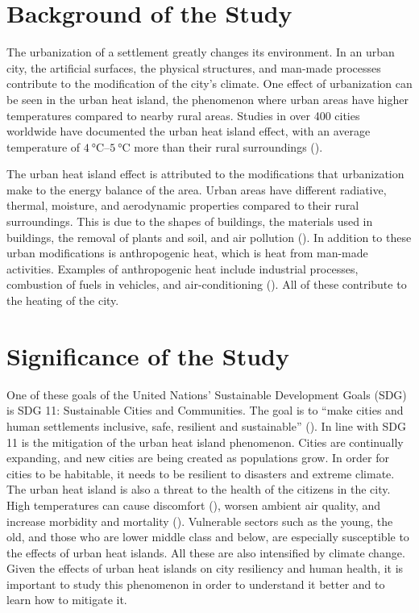 \section{Background of the Study}
	The urbanization of a settlement greatly changes its environment.
	In an urban city, the artificial surfaces, the physical structures, and man-made processes contribute to the modification of the city's climate.
	One effect of urbanization can be seen in the urban heat island, the phenomenon where urban areas have higher temperatures compared to nearby rural areas.
	Studies in over 400 cities worldwide have documented the urban heat island effect,
		with an average temperature of $\qtyrange{4}{5}{\degreeCelsius}$ more than their rural surroundings (\cite{Santamouris2020}).
	
	The urban heat island effect is attributed to the modifications that urbanization make to the energy balance of the area.
	Urban areas have different radiative, thermal, moisture, and aerodynamic properties compared to their rural surroundings.
	This is due to the shapes of buildings, the materials used in buildings, the removal of plants and soil, and air pollution (\cite{Stewart2012}).
	In addition to these urban modifications is anthropogenic heat, which is heat from man-made activities.
	Examples of anthropogenic heat include industrial processes, combustion of fuels in vehicles, and air-conditioning (\cite{Oke2017urban}).
	All of these contribute to the heating of the city.
	
\section{Significance of the Study}
	One of these goals of the United Nations' Sustainable Development Goals (SDG) is SDG 11: Sustainable Cities and Communities.
	The goal is to ``make cities and human settlements inclusive, safe, resilient and sustainable'' (\cite{UN2015}).
	In line with SDG 11 is the mitigation of the urban heat island phenomenon.
	Cities are continually expanding, and new cities are being created as populations grow.
	In order for cities to be habitable, it needs to be resilient to disasters and extreme climate.	
	The urban heat island is also a threat to the health of the citizens in the city.
	High temperatures can cause discomfort (\cite{Bhati2018}), worsen ambient air quality, and increase morbidity and mortality (\cite {Khan2021}).
	Vulnerable sectors such as the young, the old, and those who are lower middle class and below,
		are especially susceptible to the effects of urban heat islands.
	All these are also intensified by climate change.
	Given the effects of urban heat islands on city resiliency and human health,
		it is important to study this phenomenon in order to understand it better and to learn how to mitigate it.

